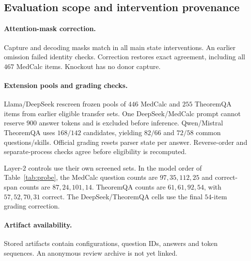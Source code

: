 \subsection{Evaluation scope and intervention provenance}
\label{app:limits}

\paragraph{Attention-mask correction.}
Capture and decoding masks match in all main state interventions.
An earlier omission failed identity checks. Correction restores exact
agreement, including all $467$ MedCalc items. Knockout has no donor capture.

\paragraph{Extension pools and grading checks.}
Llama/DeepSeek rescreen frozen pools of $446$ MedCalc and $255$ TheoremQA
items from earlier eligible transfer sets. One DeepSeek/MedCalc prompt
cannot reserve $900$ answer tokens and is excluded before inference.
Qwen/Mistral TheoremQA uses $168/142$ candidates, yielding $82/66$ and
$72/58$ common questions/skills. Official grading resets parser state
per answer. Reverse-order and separate-process checks agree before
eligibility is recomputed.

Layer-$2$ controls use their own screened sets. In the model order of
Table~\ref{tab:probe}, the MedCalc question counts are $97,35,112,25$ and
correct-span counts are $87,24,101,14$. TheoremQA counts are $61,61,92,54$,
with $57,52,70,31$ correct. The DeepSeek/TheoremQA cells use the final
$54$-item grading correction.

\paragraph{Artifact availability.}
Stored artifacts contain configurations, question IDs, answers and token
sequences. An anonymous review archive is not yet linked.



